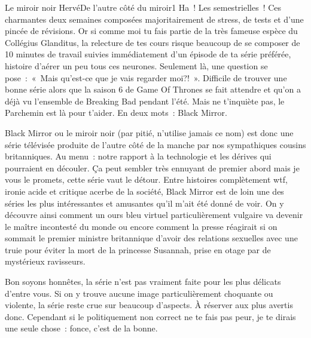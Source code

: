 \documentclass{parch}
\begin{document}
	\begin{parchArticle}{Le miroir noir}
		{Hervé}{De l'autre côté du miroir}{1}
		Ha ! Les semestrielles ! Ces charmantes deux semaines composées majoritairement de stress, de tests et d'une pincée de révisions. Or si comme moi tu fais partie de la très fameuse espèce du Collégius Glanditus, la relecture de tes cours risque beaucoup de se composer de 10 minutes de travail suivies immédiatement d'un épisode de ta série préférée, histoire d’aérer un peu tous ces neurones. Seulement là, une question se pose : « Mais qu'est-ce que je vais regarder moi?! ». Difficile de trouver une bonne série alors que la saison 6 de Game Of Thrones se fait attendre et qu'on a déjà vu l'ensemble de Breaking Bad pendant l'été. Mais ne t’inquiète pas, le Parchemin est là pour t'aider. En deux mots : Black Mirror.
		
		Black Mirror ou le miroir noir (par pitié, n'utilise jamais ce nom) est donc une série télévisée produite de l'autre côté de la manche par nos sympathiques cousins britanniques. Au menu : notre rapport à la technologie et les dérives qui pourraient en découler. Ça peut sembler très ennuyant de premier abord mais je vous le promets, cette série vaut le détour. Entre histoires complètement wtf, ironie acide et critique acerbe de la société, Black Mirror est de loin une des séries les plus intéressantes et amusantes qu'il m'ait été donné de voir. On y découvre ainsi comment un ours bleu virtuel particulièrement vulgaire va devenir le maître incontesté du monde ou encore comment la presse réagirait si on sommait le premier ministre britannique d'avoir des relations sexuelles avec une truie pour éviter la mort de la princesse Susannah, prise en otage par de mystérieux ravisseurs.
		
		Bon soyons honnêtes, la série n'est pas vraiment faite pour les plus délicats d'entre vous. Si on y trouve aucune image particulièrement choquante ou violente, la série reste crue sur beaucoup d'aspects. À réserver aux plus avertis donc. Cependant si le politiquement non correct ne te fais pas peur, je te dirais une seule chose : fonce, c'est de la bonne.
	\end{parchArticle}
	
	\newpage
	
\end{document}
